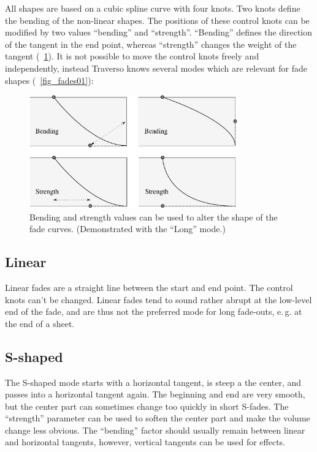All shapes are based on a cubic spline curve with four knots. Two knots define the bending of the non-linear shapes. The positions of these control knots can be modified by two values ``bending'' and ``strength''. ``Bending'' defines the direction of the tangent in the end point, whereas ``strength'' changes the weight of the tangent (\FigB~\ref{fig_fades02}). It is not possible to move the control knots freely and independently, instead Traverso knows several modes which are relevant for fade shapes (\FigB~\ref{fig_fades01}):

\begin{figure}[t]
 \centering\includegraphics[width=0.8\textwidth]{../images/fades2}
 \caption{Bending and strength values can be used to alter the shape of the fade curves. (Demonstrated with the ``Long'' mode.)}
 \label{fig_fades02}
\end{figure}

\subsection{Linear}
Linear fades are a straight line between the start and end point. The control knots can't be changed. Linear fades tend to sound rather abrupt at the low-level end of the fade, and are thus not the preferred mode for long fade-outs, e.\,g. at the end of a sheet.

\subsection{S-shaped}
The S-shaped mode starts with a horizontal tangent, is steep a the center, and passes into a horizontal tangent again. The beginning and end are very smooth, but the center part can sometimes change too quickly in short S-fades. The ``strength'' parameter can be used to soften the center part and make the volume change less obvious. The ``bending'' factor should usually remain between linear and horizontal tangents, however, vertical tangents can be used for effects.

